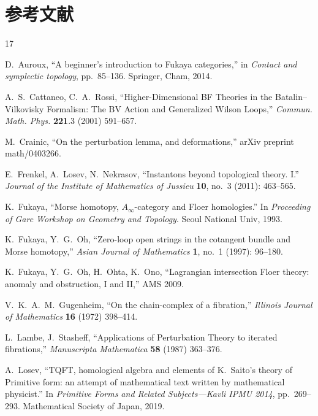 \section*{参考文献}

\begingroup
\small
\begin{thebibliography}{17}

D.~Auroux, ``A beginner's introduction to Fukaya categories,'' in \emph{Contact and symplectic topology}, pp.~85--136. Springer, Cham, 2014.

A.~S.~Cattaneo, C.~A.~Rossi, ``Higher-Dimensional BF Theories in the Batalin--Vilkovisky Formalism: The BV Action and Generalized Wilson Loops,'' \emph{Commun. Math. Phys.} \textbf{221}.3 (2001) 591--657.

M.~Crainic, ``On the perturbation lemma, and deformations,'' arXiv preprint math/0403266.

E.~Frenkel, A.~Losev, N.~Nekrasov, ``Instantons beyond topological theory. I.'' \emph{Journal of the Institute of Mathematics of Jussieu} \textbf{10}, no.~3 (2011): 463--565.

K.~Fukaya, ``Morse homotopy, $A_\infty$-category and Floer homologies.'' In \emph{Proceeding of Garc Workshop on Geometry and Topology}. Seoul National Univ, 1993.

K.~Fukaya, Y.~G.~Oh, ``Zero-loop open strings in the cotangent bundle and Morse homotopy,'' \emph{Asian Journal of Mathematics} \textbf{1}, no.~1 (1997): 96--180.

K.~Fukaya, Y.~G.~Oh, H.~Ohta, K.~Ono, ``Lagrangian intersection Floer theory: anomaly and obstruction, I and II,'' AMS 2009.

V.~K.~A.~M.~Gugenheim, ``On the chain-complex of a fibration,'' \emph{Illinois Journal of Mathematics} \textbf{16} (1972) 398--414.

L.~Lambe, J.~Stasheff, ``Applications of Perturbation Theory to iterated fibrations,'' \emph{Manuscripta Mathematica} \textbf{58} (1987) 363--376.

A.~Losev, ``TQFT, homological algebra and elements of K.~Saito's theory of Primitive form: an attempt of mathematical text written by mathematical physicist.'' In \emph{Primitive Forms and Related Subjects---Kavli IPMU 2014}, pp.~269--293. Mathematical Society of Japan, 2019.


\end{thebibliography}
